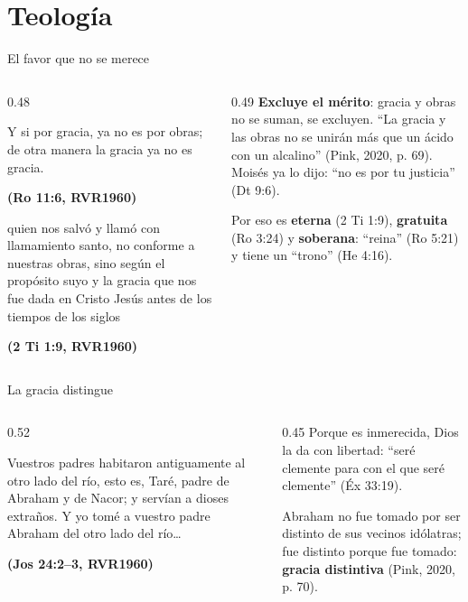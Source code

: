 \documentclass[hyperref={bookmarks=false},aspectratio=169]{beamer}
\newcommand{\fuente}[1]{\par\hfill{\upshape\bfseries\footnotesize\textcolor{azul}{#1}}}
\newcommand{\destacar}[1]{\textbf{\textcolor{azul}{#1}}}
\begin{document}
\section{Teología}

\begin{frame}{El favor que no se merece}
\begin{columns}[t,onlytextwidth]
\begin{column}{0.48\textwidth}
\begin{cita}Y si por gracia, ya no es por obras; de otra manera la gracia ya no es gracia.\fuente{(Ro 11:6, RVR1960)}\end{cita}
\begin{cita}quien nos salvó y llamó con llamamiento santo, no conforme a nuestras obras, sino según el propósito suyo y la gracia que nos fue dada en Cristo Jesús antes de los tiempos de los siglos\fuente{(2 Ti 1:9, RVR1960)}\end{cita}
\end{column}
\begin{column}{0.49\textwidth}\small
\destacar{Excluye el mérito}: gracia y obras no se suman, se excluyen. ``La gracia y las obras no se unirán más que un ácido con un alcalino'' (Pink, 2020, p. 69). Moisés ya lo dijo: ``no es por tu justicia'' (Dt 9:6).\par\medskip
Por eso es \destacar{eterna} (2 Ti 1:9), \destacar{gratuita} (Ro 3:24) y \destacar{soberana}: ``reina'' (Ro 5:21) y tiene un ``trono'' (He 4:16).
\end{column}
\end{columns}
\end{frame}

\begin{frame}{La gracia distingue}
\begin{columns}[t,onlytextwidth]
\begin{column}{0.52\textwidth}
\begin{cita}Vuestros padres habitaron antiguamente al otro lado del río, esto es, Taré, padre de Abraham y de Nacor; y servían a dioses extraños. Y yo tomé a vuestro padre Abraham del otro lado del río\ldots\fuente{(Jos 24:2--3, RVR1960)}\end{cita}
\end{column}
\begin{column}{0.45\textwidth}\small
Porque es inmerecida, Dios la da con libertad: ``seré clemente para con el que seré clemente'' (Éx 33:19).\par\medskip
Abraham no fue tomado por ser distinto de sus vecinos idólatras; fue distinto porque fue tomado: \destacar{gracia distintiva} (Pink, 2020, p. 70).
\end{column}
\end{columns}
\end{frame}
\end{document}
